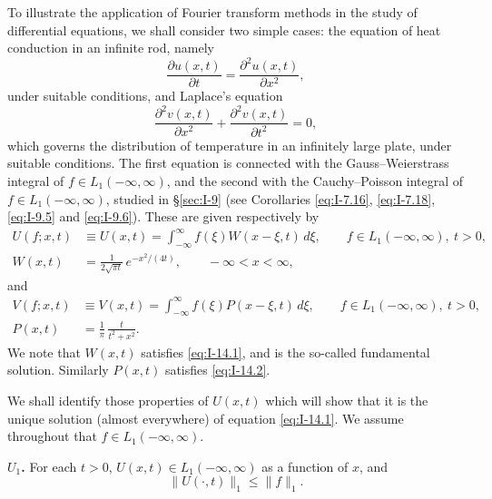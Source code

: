 To illustrate the application of Fourier transform methods in the study of differential equations, we shall consider two simple cases: the equation of heat conduction in an infinite rod, namely
\begin{equation}\label{eq:I-14.1}\tag{14.1}
\frac{\partial u(x,t)}{\partial t}=\frac{\partial^{2}u(x,t)}{\partial x^{2}},
\end{equation}
under suitable conditions, and Laplace's equation
\begin{equation}\label{eq:I-14.2}\tag{14.2}
\frac{\partial^{2}v(x,t)}{\partial x^{2}}+\frac{\partial^{2}v(x,t)}{\partial t^{2}}=0,
\end{equation}
which governs the distribution of temperature in an infinitely large plate, under suitable conditions. The first equation is connected with the Gauss--Weierstrass integral of $f\in L_1(-\infty,\infty)$, and the second with the Cauchy--Poisson integral of $f\in L_1(-\infty,\infty)$, studied in \S\ref{sec:I-9} (see Corollaries \eqref{eq:I-7.16}, \eqref{eq:I-7.18}, \eqref{eq:I-9.5} and \eqref{eq:I-9.6}). These are given respectively by
\begin{equation}\label{eq:I-14.3}\tag{14.3}
\begin{aligned}
U(f;x,t)&\equiv U(x,t)=\int_{-\infty}^{\infty}f(\xi)W(x-\xi,t)\,d\xi,\qquad f\in L_1(-\infty,\infty),\ t>0,\\
W(x,t)&=\frac{1}{2\sqrt{\pi t}}\,e^{-x^{2}/(4t)},\qquad-\infty<x<\infty,
\end{aligned}
\end{equation}
and
\begin{equation}\label{eq:I-14.4}\tag{14.4}
\begin{aligned}
V(f;x,t)&\equiv V(x,t)=\int_{-\infty}^{\infty}f(\xi)P(x-\xi,t)\,d\xi,\qquad f\in L_1(-\infty,\infty),\ t>0,\\
P(x,t)&=\frac{1}{\pi}\,\frac{t}{t^{2}+x^{2}}.
\end{aligned}
\end{equation}
We note that $W(x,t)$ satisfies \eqref{eq:I-14.1}, and is the so-called fundamental solution. Similarly $P(x,t)$ satisfies \eqref{eq:I-14.2}.

We shall identify those properties of $U(x,t)$ which will show that it is the unique solution (almost everywhere) of equation \eqref{eq:I-14.1}. We assume throughout that $f\in L_1(-\infty,\infty)$.

\noindent\textbf{$U_1$.} For each $t>0$, $U(x,t)\in L_1(-\infty,\infty)$ as a function of $x$, and
\begin{equation*}
\|U(\cdot,t)\|_1\le\|f\|_1.
\end{equation*}


